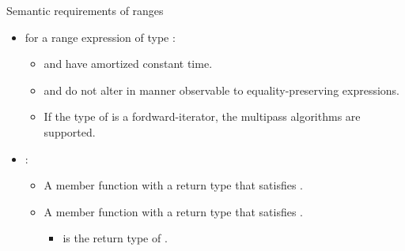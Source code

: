 \begin{frame}[t,fragile]{Semantic requirements of ranges}
\begin{itemize}
  \item {} for a range expression  of type :
    \begin{itemize}
      \item {} and 
            have amortized constant time.
      \item {} and  
            do not alter  in manner observable to equality-preserving
            expressions.
      \item If the type of  is a
            fordward-iterator, the multipass algorithms are supported.
    \end{itemize}

  \item {}:
    \begin{itemize}
      \item A member function  with a return type that
            satisfies .
      \item A member function  with a return type that
            satisfies .
        \begin{itemize}
          \item {} is the return type of .
        \end{itemize}
    \end{itemize}
\end{itemize}
\end{frame}

